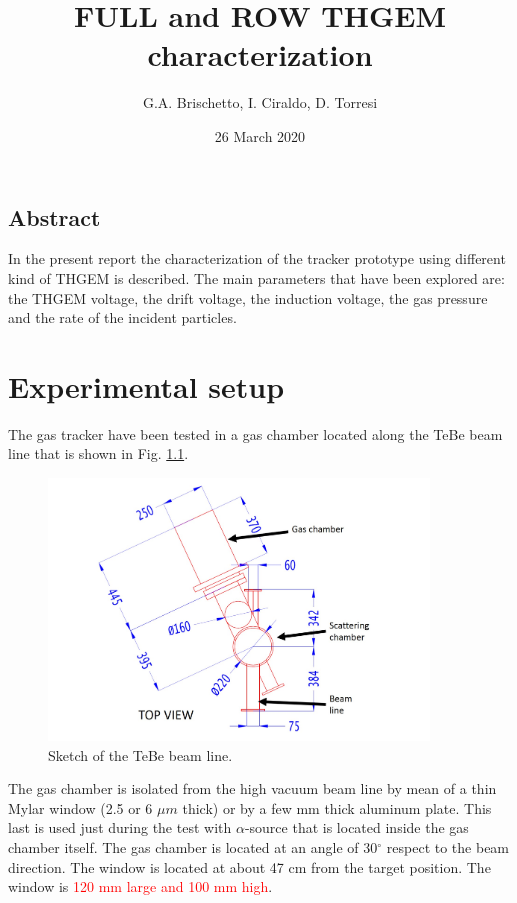 \documentclass[a4paper, 11 pt]{report}
\title{\bf {\huge FULL and ROW THGEM characterization} }
\author{G.A. Brischetto, I. Ciraldo, D. Torresi}
\date{26 March 2020}
\begin{document}
\maketitle

\section*{Abstract}

In the present report the characterization of the tracker prototype using different kind of THGEM is 
described. The main parameters that have been explored are: the THGEM voltage, the drift voltage,
the induction voltage, the gas pressure and the rate of the incident particles.

\chapter{Experimental setup}

The gas tracker have been tested in a gas chamber located along the TeBe beam line that is shown in Fig. 
\ref{fig:TeBeline}.
\begin{figure}
	\centering
	\includegraphics[width=0.9\textwidth]{Immagini/TeBe_scheme.jpg}
	\caption{Sketch of the TeBe beam line.}
	\label{fig:TeBeline}
\end{figure}
The gas chamber is isolated from the high vacuum beam line by mean of a thin Mylar window (2.5 or 6 
$\mu m$ thick) or by a few mm thick aluminum plate. This last is used just during the test with 
$\alpha$-source that is located inside the gas chamber itself. The gas chamber is located at an 
angle of 30$^{\circ}$ respect to the beam direction. The window is located at about 47 cm from the 
target position. The window is \textcolor{red}{ 120 mm large and 100 mm high}.\\
\end{document}
